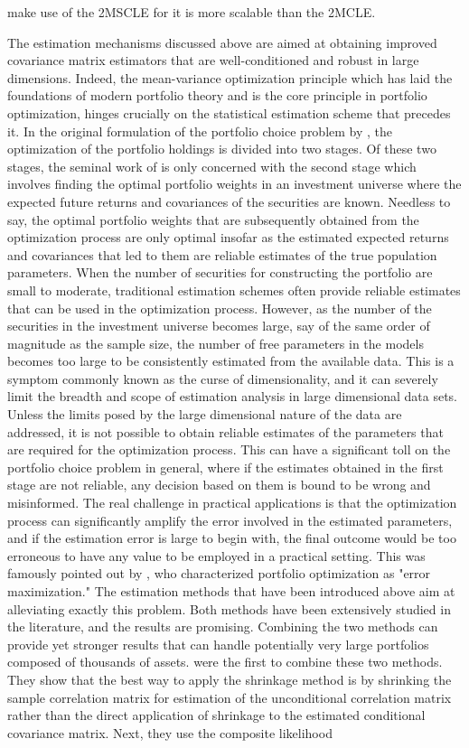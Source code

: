 make use of the 2MSCLE for it is more scalable than the 2MCLE.

The estimation mechanisms discussed above are aimed at obtaining improved covariance matrix estimators that are well-conditioned and robust in large dimensions. Indeed, the mean-variance optimization principle which has laid the foundations of modern portfolio theory and is the core principle in portfolio optimization, hinges crucially on the statistical estimation scheme that precedes it. In the original formulation of the portfolio choice problem by \textcite{MARKOWITZ}, the optimization of the portfolio holdings is divided into two stages. Of these two stages, the seminal work of \textcite{MARKOWITZ} is only concerned with the second stage which involves finding the optimal portfolio weights in an investment universe where the expected future returns and covariances of the securities are known. Needless to say, the optimal portfolio weights that are subsequently obtained from the optimization process are only optimal insofar as the estimated expected returns and covariances that led to them are reliable estimates of the true population parameters. When the number of securities for constructing the portfolio are small to moderate, traditional estimation schemes often provide reliable estimates that can be used in the optimization process. However, as the number of the securities in the investment universe becomes large, say of the same order of magnitude as the sample size, the number of free parameters in the models becomes too large to be consistently estimated from the available data. This is a symptom commonly known as the curse of dimensionality, and it can severely limit the breadth and scope of estimation analysis in large dimensional data sets. Unless the limits posed by the large dimensional nature of the data are addressed, it is not possible to obtain reliable estimates of the parameters that are required for the optimization process. This can have a significant toll on the portfolio choice problem in general, where if the estimates obtained in the first stage are not reliable, any decision based on them is bound to be wrong and misinformed. The real challenge in practical applications is that the optimization process can significantly amplify the error involved in the estimated parameters, and if the estimation error is large to begin with, the final outcome would be too erroneous to have any value to be employed in a practical setting. This was famously pointed out by \textcite{MICHAUD}, who characterized portfolio optimization as "error maximization." The estimation methods that have been introduced above aim at alleviating exactly this problem. Both methods have been extensively studied in the literature, and the results are promising. Combining the two methods can provide yet stronger results that can handle potentially very large portfolios composed of thousands of assets. \textcite{ELW2019} were the first to combine these two methods. They show that the best way to apply the shrinkage method is by shrinking the sample correlation matrix for estimation of the unconditional correlation matrix rather than the direct application of shrinkage to the estimated conditional covariance matrix. Next, they use the composite likelihood 